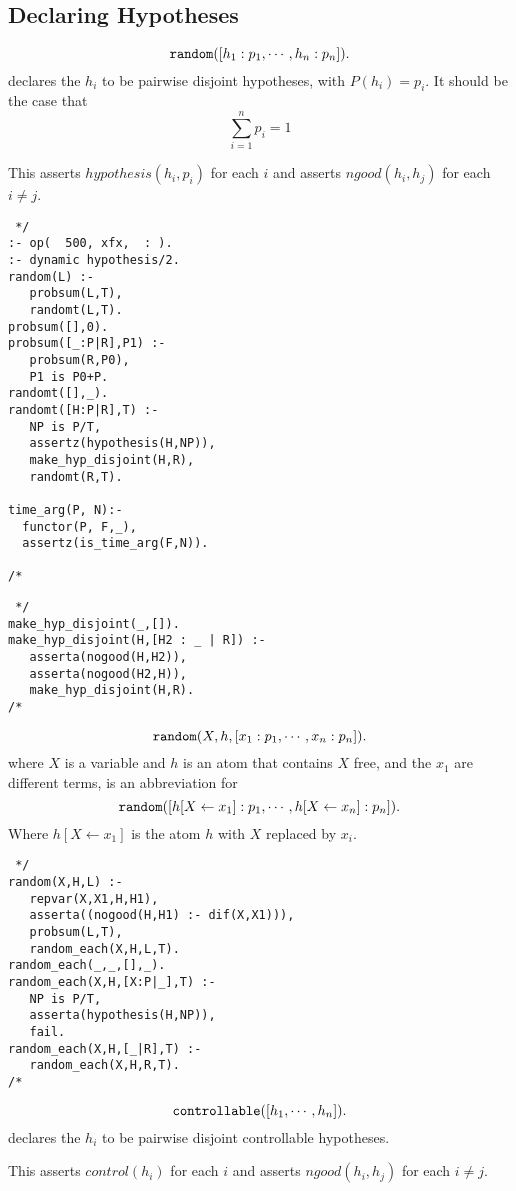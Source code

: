\documentclass[11pt,fleqn]{article}
\begin{document}
\subsection{Declaring Hypotheses}

\[\hbox{\ttfamily random}([h_1:p_1,\cdots,h_n:p_n]).\]
declares the $h_i$ to be pairwise disjoint hypotheses, with $P(h_i)=p_i$.
It should be the case that 
\[\sum_{i=1}^n p_i = 1\]

This asserts $hypothesis(h_i,p_i)$ for each $i$ and asserts
$ngood(h_i,h_j)$ for each $i \neq j$.

\begin{verbatim} */
:- op(  500, xfx,  : ).
:- dynamic hypothesis/2.
random(L) :-
   probsum(L,T),
   randomt(L,T).
probsum([],0).
probsum([_:P|R],P1) :-
   probsum(R,P0),
   P1 is P0+P.
randomt([],_).
randomt([H:P|R],T) :-
   NP is P/T,
   assertz(hypothesis(H,NP)),
   make_hyp_disjoint(H,R),
   randomt(R,T).

time_arg(P, N):- 
  functor(P, F,_),
  assertz(is_time_arg(F,N)).
 
/* \end{verbatim}
\begin{verbatim} */
make_hyp_disjoint(_,[]).
make_hyp_disjoint(H,[H2 : _ | R]) :-
   asserta(nogood(H,H2)),
   asserta(nogood(H2,H)),
   make_hyp_disjoint(H,R).
/* \end{verbatim}

\[\hbox{\ttfamily random}(X,h,[x_1:p_1,\cdots,x_n:p_n]).\]
where $X$ is a variable and $h$ is an atom that contains $X$ free, and the $x_1$ are different terms, is an abbreviation for
\[\hbox{\ttfamily random}([h[X \leftarrow x_1]:p_1,\cdots,h[X \leftarrow x_n]:p_n]).\]
Where $h[X \leftarrow x_1]$ is the atom $h$ with $X$ replaced by $x_i$.
\begin{verbatim} */
random(X,H,L) :-
   repvar(X,X1,H,H1),
   asserta((nogood(H,H1) :- dif(X,X1))),
   probsum(L,T),
   random_each(X,H,L,T).
random_each(_,_,[],_).
random_each(X,H,[X:P|_],T) :-
   NP is P/T,
   asserta(hypothesis(H,NP)),
   fail.
random_each(X,H,[_|R],T) :-
   random_each(X,H,R,T).
/* \end{verbatim}



\[\hbox{\ttfamily controllable}([h_1,\cdots,h_n]).\]
declares the $h_i$ to be pairwise disjoint controllable hypotheses.

This asserts $control(h_i)$ for each $i$ and asserts
$ngood(h_i,h_j)$ for each $i \neq j$.
\end{document}
